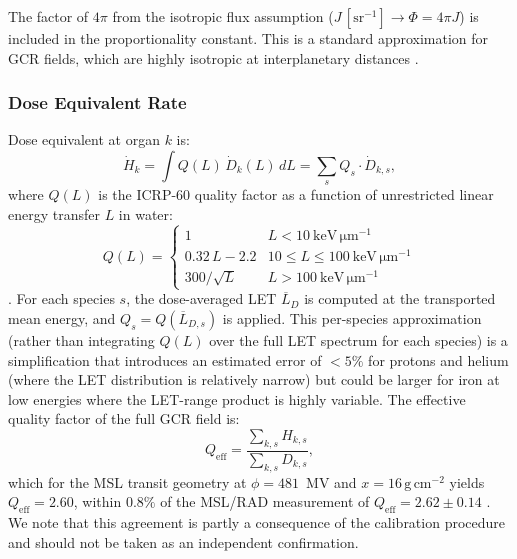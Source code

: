 The factor of $4\pi$ from the isotropic flux assumption
($J \, [\mathrm{sr}^{-1}] \to \Phi = 4\pi J$) is included in the
proportionality constant.
This is a standard approximation for GCR fields, which are highly isotropic
at interplanetary distances \citep{simpson1983}.

\subsubsection{Dose Equivalent Rate}
\label{sec:doseequiv}

Dose equivalent at organ $k$ is:
\begin{equation}
  \dot{H}_k = \int Q(L)\, \dot{D}_k(L) \,dL
            = \sum_s Q_s \cdot \dot{D}_{k,s},
  \label{eq:doseequiv}
\end{equation}
where $Q(L)$ is the ICRP-60 quality factor as a function of unrestricted
linear energy transfer $L$ in water:
\begin{equation}
  Q(L) = \begin{cases}
    1                & L < 10~\mathrm{keV\,\mu m^{-1}} \\
    0.32\,L - 2.2   & 10 \leq L \leq 100~\mathrm{keV\,\mu m^{-1}} \\
    300 / \sqrt{L}  & L > 100~\mathrm{keV\,\mu m^{-1}}
  \end{cases}
  \label{eq:quality}
\end{equation}
\citep{icrp60}.
For each species $s$, the dose-averaged LET $\overline{L}_D$ is computed at
the transported mean energy, and $Q_s = Q(\overline{L}_{D,s})$ is applied.
This per-species approximation (rather than integrating $Q(L)$ over the
full LET spectrum for each species) is a simplification that introduces
an estimated error of $<5\%$ for protons and helium (where the LET
distribution is relatively narrow) but could be larger for iron at
low energies where the LET-range product is highly variable.
The effective quality factor of the full GCR field is:
\begin{equation}
  Q_\mathrm{eff} = \frac{\sum_{k,s} H_{k,s}}{\sum_{k,s} D_{k,s}},
  \label{eq:qeff}
\end{equation}
which for the MSL transit geometry at $\phi = 481$~MV and $x = 16\,\mathrm{g\,cm^{-2}}$
yields $Q_\mathrm{eff} = 2.60$, within $0.8\%$ of the MSL/RAD measurement
of $Q_\mathrm{eff} = 2.62 \pm 0.14$ \citep{zeitlin2013}.
We note that this agreement is partly a consequence of the calibration
procedure and should not be taken as an independent confirmation.

